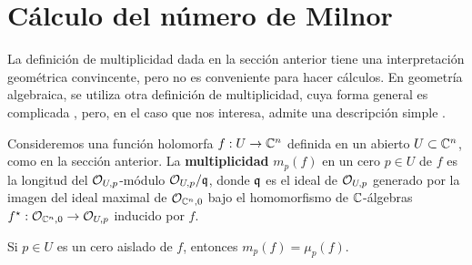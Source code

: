 \section{Cálculo del número de Milnor}

La definición de multiplicidad dada en la sección anterior tiene una interpretación geométrica convincente, pero no es conveniente para hacer cálculos. En geometría algebraica, se utiliza otra definición de multiplicidad, cuya forma general es complicada \cite[p. 120, def. 7.1]{fulton}, pero, en el caso que nos interesa, admite una descripción simple \cite[p. 123, ej. 7.1.10]{fulton}.

Consideremos una función holomorfa $f : U \to \mathbb C^n$ definida en un abierto $U \subset \mathbb C^n$, como en la sección anterior. La \textbf{multiplicidad} $m_p(f)$ en un cero $p \in U$ de $f$ es la longitud del $\mathcal O_{U,p}$-módulo $\mathcal O_{U,p} / \mathfrak q$, donde $\mathfrak q$ es el ideal de $\mathcal O_{U,p}$ generado por la imagen del ideal maximal de $\mathcal O_{\mathbb C^n, 0}$ bajo el homomorfismo de $\mathbb C$-álgebras $f^\star : \mathcal O_{\mathbb C^n, 0} \to \mathcal O_{U,p}$ inducido por $f$.

\begin{theorem}
Si $p \in U$ es un cero aislado de $f$, entonces $m_p(f) = \mu_p(f)$.
\end{theorem}

